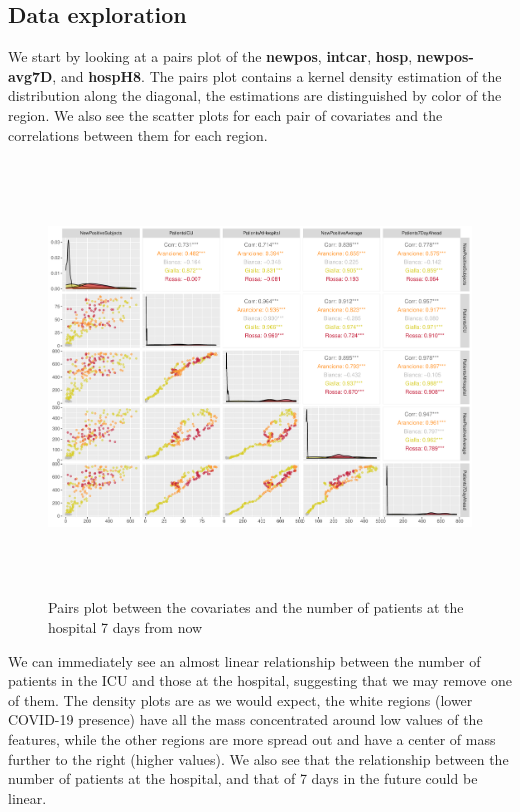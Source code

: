 \documentclass[12pt,a4paper]{article}
\theoremstyle{definition}
\theoremstyle{remark}
\begin{document}
 
	\subsection{Data exploration}
	We start by looking at a pairs plot of the \textbf{newpos}, \textbf{intcar}, \textbf{hosp}, \textbf{newpos-avg7D}, and \textbf{hospH8}. The pairs plot contains a kernel density estimation of the distribution along the diagonal, the estimations are distinguished by color of the region. We also see the scatter plots for each pair of covariates and the correlations between them for each region.
	\begin{figure}[htb!]
		\centering
		\includegraphics[width=150mm, height=115mm,scale=0.5]{corrplot.pdf}
			\caption{Pairs plot between the covariates and the number of patients at the hospital 7 days from now}
	\end{figure}
	
	We can immediately see an almost linear relationship between the number of patients in the ICU and those at the hospital, suggesting that we may remove one of them. The density plots are as we would expect, the white regions (lower COVID-19 presence) have all the mass concentrated around low values of the features, while the other regions are more spread out and have a center of mass further to the right (higher values). We also see that the relationship between the number of patients at the hospital, and that of 7 days in the future could be linear.
	
\end{document}
